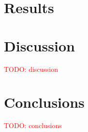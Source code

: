 \documentclass[review,sigconf]{acmart}
\newcommand{\todo}[1]{\textcolor{red}{TODO: #1}}
\begin{document}
\section{Results}

\section{Discussion}
\todo{discussion}

\section{Conclusions}
\todo{conclusions}



\end{document}
